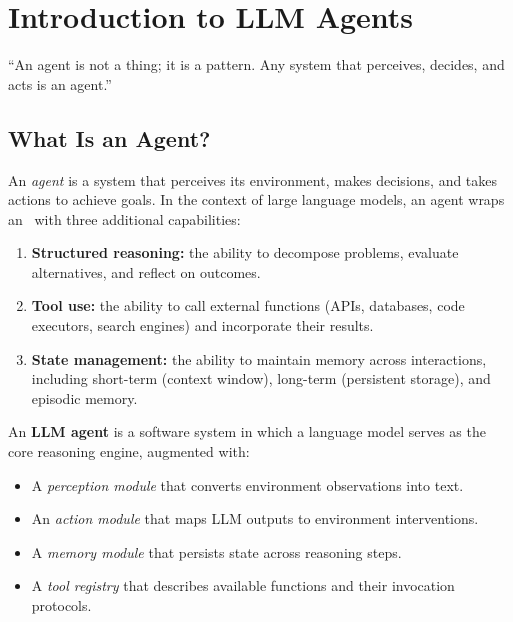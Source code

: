 \chapter{Introduction to LLM Agents}
\label{ch:introduction}

\epigraph{``An agent is not a thing; it is a pattern. Any system that perceives, decides, and acts is an agent.''}{}


\section{What Is an Agent?}

An \emph{agent} is a system that perceives its environment, makes decisions, and takes actions to achieve goals. In the context of large language models, an agent wraps an \llm\ with three additional capabilities:

\begin{enumerate}
	\item \textbf{Structured reasoning:} the ability to decompose problems, evaluate alternatives, and reflect on outcomes.
	\item \textbf{Tool use:} the ability to call external functions (APIs, databases, code executors, search engines) and incorporate their results.
	\item \textbf{State management:} the ability to maintain memory across interactions, including short-term (context window), long-term (persistent storage), and episodic memory.
\end{enumerate}

\begin{definition}
	An \textbf{LLM agent} is a software system in which a language model serves as the core reasoning engine, augmented with:
	\begin{itemize}
		\item A \emph{perception module} that converts environment observations into text.
		\item An \emph{action module} that maps LLM outputs to environment interventions.
		\item A \emph{memory module} that persists state across reasoning steps.
		\item A \emph{tool registry} that describes available functions and their invocation protocols.
	\end{itemize}
\end{definition}

